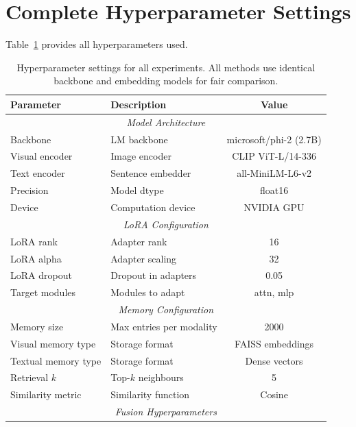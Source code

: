 \documentclass[11pt]{article}
\begin{document}
\section{Complete Hyperparameter Settings}
\label{app:hyperparams}

Table~\ref{tab:hyperparams} provides all hyperparameters used.

\begin{table}[t]
\centering
\caption{Hyperparameter settings for all experiments. All methods use identical
backbone and embedding models for fair comparison.}
\label{tab:hyperparams}
\small
\begin{tabular}{@{}llc@{}}
\toprule
\textbf{Parameter} & \textbf{Description} & \textbf{Value} \\
\midrule
\multicolumn{3}{c}{\textit{Model Architecture}} \\
\midrule
Backbone           & LM backbone              & microsoft/phi-2 (2.7B) \\
Visual encoder     & Image encoder            & CLIP ViT-L/14-336 \\
Text encoder       & Sentence embedder        & all-MiniLM-L6-v2 \\
Precision          & Model dtype              & float16 \\
Device             & Computation device       & NVIDIA GPU \\
\midrule
\multicolumn{3}{c}{\textit{LoRA Configuration}} \\
\midrule
LoRA rank          & Adapter rank             & 16 \\
LoRA alpha         & Adapter scaling          & 32 \\
LoRA dropout       & Dropout in adapters      & 0.05 \\
Target modules     & Modules to adapt         & attn, mlp \\
\midrule
\multicolumn{3}{c}{\textit{Memory Configuration}} \\
\midrule
Memory size        & Max entries per modality & 2000 \\
Visual memory type & Storage format           & FAISS embeddings \\
Textual memory type & Storage format          & Dense vectors \\
Retrieval $k$      & Top-$k$ neighbours       & 5 \\
Similarity metric  & Similarity function      & Cosine \\
\midrule
\multicolumn{3}{c}{\textit{Fusion Hyperparameters}} \\

\end{tabular}
\end{table}
\end{document}
